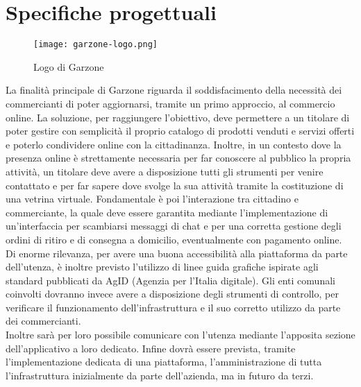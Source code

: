 \section{Specifiche progettuali}
\begin{figure}[!htb]
    \centering
    \texttt{[image: garzone-logo.png]}
    \caption{Logo di Garzone}
\end{figure}
La finalità principale di Garzone riguarda il soddisfacimento della necessità dei commercianti di poter aggiornarsi, tramite un primo approccio, al commercio online. La soluzione, per raggiungere l'obiettivo, deve permettere a un titolare di poter gestire con semplicità il proprio catalogo di prodotti venduti e servizi offerti e poterlo condividere online con la cittadinanza. Inoltre, in un contesto dove la presenza online è strettamente necessaria per far conoscere al pubblico la propria attività, un titolare deve avere a disposizione tutti gli strumenti per venire contattato e per far sapere dove svolge la sua attività tramite la costituzione di una vetrina virtuale. Fondamentale è poi l'interazione tra cittadino e commerciante, la quale deve essere garantita mediante l'implementazione di un'interfaccia per scambiarsi messaggi di chat e per una corretta gestione degli ordini di ritiro e di consegna a domicilio, eventualmente con pagamento online. \\Di enorme rilevanza, per avere una buona accessibilità alla piattaforma da parte dell'utenza, è inoltre previsto l'utilizzo di linee guida grafiche ispirate agli standard pubblicati da AgID (Agenzia per l'Italia digitale)\cite{AGID}. Gli enti comunali coinvolti dovranno invece avere a disposizione degli strumenti di controllo, per verificare il funzionamento dell'infrastruttura e il suo corretto utilizzo da parte dei commercianti. \\Inoltre sarà per loro possibile comunicare con l'utenza mediante l'apposita sezione dell'applicativo a loro dedicato. Infine dovrà essere prevista, tramite l'implementazione dedicata di una piattaforma, l'amministrazione di tutta l'infrastruttura inizialmente da parte dell'azienda, ma in futuro da terzi. 
